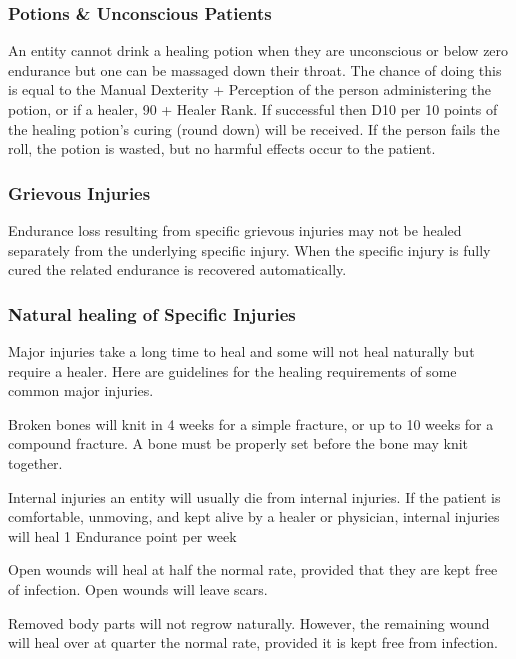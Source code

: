 \begin{multicols*}{3}
\subsubsection{Potions \& Unconscious Patients}

An entity cannot drink a healing potion when they are unconscious or
below zero endurance but one can be massaged down their throat. The
chance of doing this is equal to the Manual Dexterity + Perception of
the person administering the potion, or if a healer, 90 + Healer
Rank. If successful then D10 per 10 points of the healing potion's
curing (round down) will be received. If the person fails the roll,
the potion is wasted, but no harmful effects occur to the patient.

\subsubsection{Grievous Injuries}

Endurance loss resulting from specific grievous injuries may not be
healed separately from the underlying specific injury.  When the
specific injury is fully cured the related endurance is recovered
automatically.

\subsubsection{Natural healing of Specific Injuries}

Major injuries take a long time to heal and some will not heal
naturally but require a healer. Here are guidelines for the healing
requirements of some common major injuries.
\begin{Description}
\item[Broken bones] will knit in 4 weeks for a simple fracture, or up
to 10 weeks for a compound fracture.  A bone must be properly set
before the bone may knit together.

\item[Internal injuries] an entity will usually die from internal
injuries. If the patient is comfortable, unmoving, and kept alive by a
healer or physician, internal injuries will heal 1 Endurance point per
week

\item[Open wounds] will heal at half the normal rate, provided that
they are kept free of infection. Open wounds will leave scars.

\item[Removed body parts] will not regrow naturally. However, the
remaining wound will heal over at quarter the normal rate, provided it
is kept free from infection.


\end{Description}
\end{multicols*}
